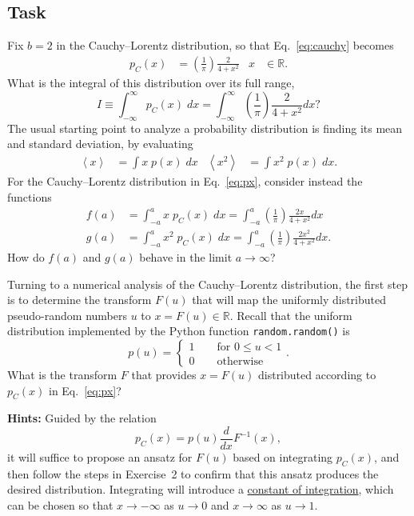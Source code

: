 \documentclass[12 pt]{article} %
\newcommand{\Rbb}{\ensuremath{\mathbb R} }
\newcommand{\vev}[1]{\ensuremath{\left\langle #1 \right\rangle} }
\newcommand{\eq}[1]{Eq.~\ref{#1}}
\newcommand{\showmarks}[1]{\rightline{\texttt{[#1 marks]}}} %
\begin{document}
\subsection*{Task}
Fix $b = 2$ in the Cauchy--Lorentz distribution, so that \eq{eq:cauchy} becomes
\begin{align}
  \label{eq:px}
  p_C(x) & = \left(\frac{1}{\pi}\right) \frac{2}{4 + x^2} &
  x & \in \Rbb.
\end{align}
What is the integral of this distribution over its full range,
\begin{equation*}
  I \equiv \int_{-\infty}^{\infty} p_C(x) \; dx = \int_{-\infty}^{\infty} \left(\frac{1}{\pi}\right) \frac{2}{4 + x^2} dx?
\end{equation*}
The usual starting point to analyze a probability distribution is finding its mean and standard deviation, by evaluating
\begin{align*}
  \vev{x} & = \int x \; p(x) \; dx &
  \vev{x^2} & = \int x^2 \; p(x) \; dx.
\end{align*}
For the Cauchy--Lorentz distribution in \eq{eq:px}, consider instead the functions
\begin{align*}
  f(a) & = \int_{-a}^a x \; p_C(x) \; dx = \int_{-a}^a \left(\frac{1}{\pi}\right) \frac{2x}{4 + x^2} dx \\
  g(a) & = \int_{-a}^a x^2 \; p_C(x) \; dx = \int_{-a}^a \left(\frac{1}{\pi}\right) \frac{2x^2}{4 + x^2} dx.
\end{align*}
How do $f(a)$ and $g(a)$ behave in the limit $a \to \infty$?

\showmarks{6}

\newpage %
Turning to a numerical analysis of the Cauchy--Lorentz distribution, the first step is to determine the transform $F(u)$ that will map the uniformly distributed pseudo-random numbers $u$ to $x = F(u) \in \Rbb$.
Recall that the uniform distribution implemented by the Python function \texttt{random.random()} is
\begin{equation*}
  p(u) = \left\{\begin{array}{l}1 \qquad \mbox{for } 0 \leq u < 1 \\
                                0 \qquad \mbox{otherwise}\end{array}\right. .
\end{equation*}
What is the transform $F$ that provides $x = F(u)$ distributed according to $p_C(x)$ in \eq{eq:px}?

\textbf{Hints:} Guided by the relation
\begin{equation*}
  p_C(x) = p(u) \frac{d}{dx} F^{-1}(x),
\end{equation*}
it will suffice to propose an ansatz for $F(u)$ based on integrating $p_C(x)$, and then follow the steps in Exercise~2 to confirm that this ansatz produces the desired distribution.
Integrating will introduce a \href{https://en.wikipedia.org/wiki/Constant_of_integration}{constant of integration}, which can be chosen so that $x \to -\infty$ as $u \to 0$ and $x \to \infty$ as $u \to 1$.
\end{document}

